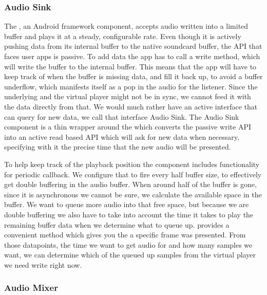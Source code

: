 \subsubsection{Audio Sink}\label{subsubsec:audiotrack}

The , an Android framework component, accepts audio
written into a limited buffer and plays it at a steady, configurable
rate. Even though it is actively pushing data from its internal buffer
to the native soundcard buffer, the API that faces user apps is passive.
To add data the app has to call a write method, which will write the
buffer to the internal  buffer. This means that the app
will have to keep track of when the  buffer is missing data,
and fill it back up, to avoid a buffer underflow, which manifests itself
as a pop in the audio for the listener. Since the underlying
 and the virtual player might not be in sync, we cannot
feed it with the data directly from that. We would much rather have an
active interface that can query for new data, we call that interface
Audio Sink. The Audio Sink component is a thin wrapper around the
 which converts the passive write API into an active
read based API which will ask for new data when necessary, specifying
with it the precise time that the new audio will be presented.

To help keep track of the playback position the 
component includes functionality for periodic callback. We configure
that to fire every half buffer size, to effectively get double buffering
in the audio buffer. When around half of the buffer is gone, since it is
asynchronous we cannot be sure, we calculate the available space in the
buffer. We want to queue more audio into that free space, but because we
are double buffering we also have to take into account the time it takes
to play the remaining buffer data when we determine what to queue up.
 provides a convenient  method which
gives you the  a specific frame was presented. From those
datapoints, the time we want to get audio for and how many samples we
want, we can determine which of the queued up samples from the virtual
player we need write right now.

\subsubsection{Audio Mixer}\label{subsubsec:audiomixer}


